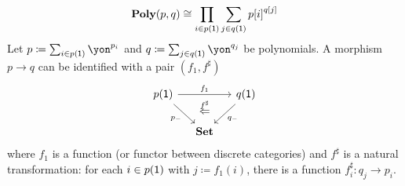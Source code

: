 \documentclass[Book-Poly]{subfiles}
\begin{document}
\begin{proposition}\label{prop.poly_maps_colax_prod_sum}
%
\begin{equation}\label{eqn.main_formula}
\textbf{Poly}(p,q)\cong\prod_{i\in p(\textsf{1})}\sum_{j\in q(\textsf{1})}{p[i]}^{q[j]}
\end{equation}
Let $p\coloneqq\sum_{i\in p(\1)}\yon^{p_i}$ and $q\coloneqq\sum_{j\in q(\1)}\yon^{q_j}$ be polynomials. A morphism $p\to q$ can be identified with a pair $(f_1,f^\sharp)$
\begin{equation}\label{eqn.colax_poly_map}
\begin{tikzcd}[column sep=small]
	p(\1)\ar[dr, "p_-"']\ar[rr, "f_1"]&~&
	q(\1)\ar[dl, "q_-"]\\&
	\smset\ar[u, phantom, near end, "\overset{f^\sharp}{\Leftarrow}"]
\end{tikzcd}
\end{equation}
where $f_1$ is a function (or functor between discrete categories) and $f^\sharp$ is a natural transformation: for each $i\in p(\textsf{1})$ with $j\coloneqq f_1(i)$, there is a function $f^\sharp_i\colon q_j\to p_i$.
\end{proposition}
\end{document}
